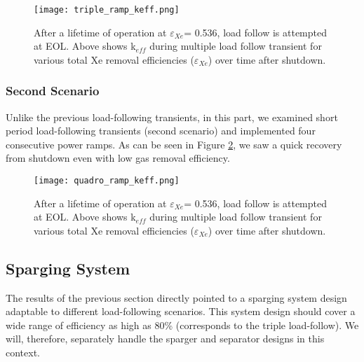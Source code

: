 \begin{itemize}
    \begin{figure}[htbp!]
        \begin{center}
            \texttt{[image: triple\_ramp\_keff.png]}
        \end{center}
        \caption{After a lifetime of operation at $\varepsilon$$_{Xe}$= 0.536, 
            load follow is attempted at EOL. Above shows  k$_{eff}$ during 
            multiple load follow transient for various total Xe removal 
            efficiencies
        ($\varepsilon$$_{Xe}$) over time after shutdown.}
        \label{fig:triple_keff}
    \end{figure}

\FloatBarrier

\subsubsection{Second Scenario}

    Unlike the previous load-following transients, in this part, we examined short 
    period load-following transients (second scenario) and implemented four 
    consecutive power ramps. As can be seen in Figure \ref{fig:quadro_keff}, we 
    saw a quick recovery from shutdown even with low gas removal efficiency.

    \begin{figure}[htbp!]
        \begin{center}
            \texttt{[image: quadro\_ramp\_keff.png]}
        \end{center}
        \caption{After a lifetime of operation at $\varepsilon$$_{Xe}$= 0.536, 
            load follow is attempted at EOL. Above shows  k$_{eff}$ during 
            multiple load follow transient for various total Xe removal 
            efficiencies
        ($\varepsilon$$_{Xe}$) over time after shutdown.}
        \label{fig:quadro_keff}
    \end{figure}

\FloatBarrier

\subsection{Sparging System}

    The results of the previous section directly pointed to a sparging system 
    design adaptable to different load-following scenarios. This system design 
    should cover a wide range of efficiency as high as 80\% (corresponds to the 
    triple load-follow). We will, therefore, separately handle the sparger and 
    separator designs in this context.


\end{itemize}
